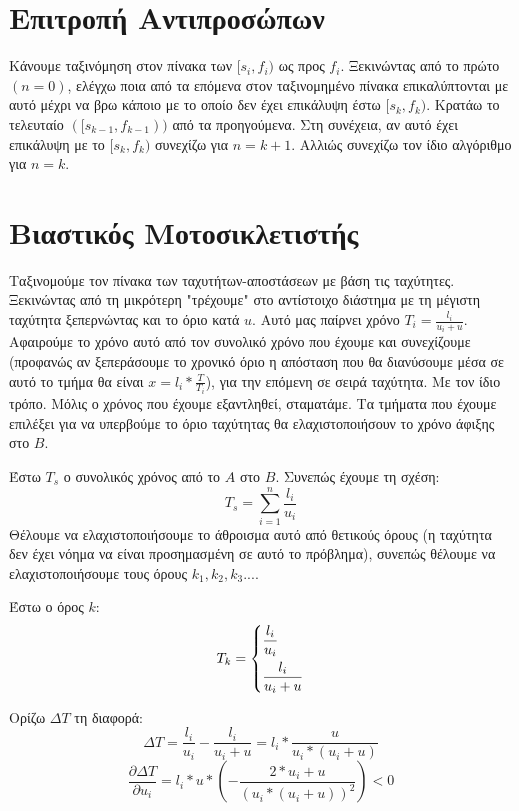 \documentclass[a4paper,10pt]{article} \usepackage{anysize}
\begin{document}
\def\thesubsection {\alph{subsection}}
\renewcommand{\labelenumi}{\roman{enumi})}
\renewcommand{\labelenumii}{(\arabic{enumii})}




\section{Επιτροπή Αντιπροσώπων} \setcounter{section}{1}
Κάνουμε ταξινόμηση στον πίνακα των $[s_i,f_i)$ ως προς $f_i$. Ξεκινώντας από
 το πρώτο $(n=0)$, ελέγχω ποια από τα επόμενα στον ταξινομημένο πίνακα επικαλύπτονται
με αυτό μέχρι να βρω κάποιο με το οποίο δεν έχει επικάλυψη έστω $[s_k,f_k)$. Κρατάω
το τελευταίο $([s_{k-1},f_{k-1}))$ από τα προηγούμενα. Στη συνέχεια, αν αυτό έχει
επικάλυψη με το $[s_k,f_k)$ συνεχίζω για $n=k+1$. Αλλιώς συνεχίζω
τον ίδιο αλγόριθμο για $n=k$.


\section{Βιαστικός Μοτοσικλετιστής}
Ταξινομούμε τον πίνακα των ταχυτήτων-αποστάσεων με βάση τις ταχύτητες.
Ξεκινώντας από τη μικρότερη "τρέχουμε" στο αντίστοιχο διάστημα με τη μέγιστη
ταχύτητα ξεπερνώντας και το όριο κατά $u$. Αυτό μας παίρνει χρόνο
$T_i=\frac{l_i}{u_i+u}$. Αφαιρούμε το χρόνο αυτό από τον συνολικό χρόνο που
έχουμε και συνεχίζουμε (προφανώς αν ξεπεράσουμε το χρονικό όριο η απόσταση που
θα διανύσουμε μέσα σε αυτό το τμήμα θα είναι $x=l_i*\frac{T}{T_i}$), για την
επόμενη σε σειρά ταχύτητα. Με τον ίδιο τρόπο. Μόλις ο χρόνος που έχουμε
εξαντληθεί, σταματάμε. Τα τμήματα που έχουμε επιλέξει για να υπερβούμε το όριο
ταχύτητας θα ελαχιστοποιήσουν το χρόνο άφιξης στο $B$.

Έστω $T_s$ ο συνολικός χρόνος από το $A$ στο $B$. Συνεπώς έχουμε τη σχέση:
\[
T_s=\sum_{i=1}^n{\frac{l_i}{u_i}}
\]
Θέλουμε να ελαχιστοποιήσουμε το άθροισμα αυτό από θετικούς όρους (η ταχύτητα
δεν έχει νόημα να είναι προσημασμένη σε αυτό το πρόβλημα), συνεπώς θέλουμε να
ελαχιστοποιήσουμε τους όρους $k_1, k_2, k_3 ...$.

Έστω ο όρος $k$:
\[
T_k=
	\begin{dcases}
	\frac{l_i}{u_i} \\
	\frac{l_i}{u_i+u}  
	\end{dcases}
\]

Ορίζω $\Delta{T}$ τη διαφορά:
\[
	\Delta{T}=\frac{l_i}{u_i} - \frac{l_i}{u_i+u} = l_i*\frac{u}{u_i*(u_i+u)}
\] 
\[
	\frac{\partial{\Delta{T}}}{\partial{u_i}} =
	l_i*u*(-\frac{2*u_i+u}{(u_i*(u_i+u))^2}) < 0
\]
\end{document}
